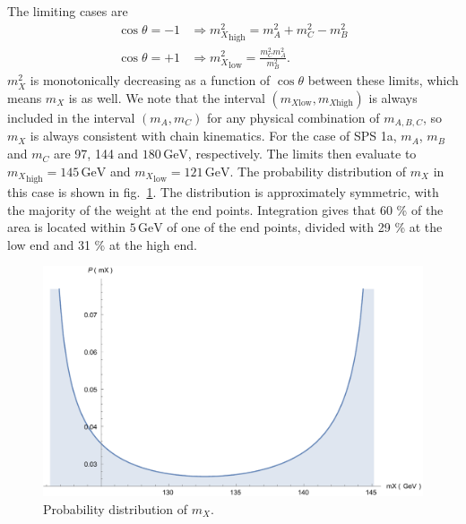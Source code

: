 \documentclass[twoside,english]{uiofysmaster}
\begin{document}
The limiting cases are
\begin{align}
	\cos\theta = -1 &\Rightarrow {m_X^2}_\mathrm{high} = m_A^2 + m_C^2 - m_B^2\\
	\cos\theta = +1 &\Rightarrow {m_X^2}_\mathrm{low} = \frac{m_C^2 m_A^2}{m_B^2}.\nonumber
\end{align}
$m_X^2$ is monotonically decreasing as a function of $\cos\theta$ between these limits, which means $m_X$ is as well. We note that the interval $(m_{X\mathrm{low}},m_{X\mathrm{high}})$ is always included in the interval $(m_A, m_C)$ for any physical combination of $m_{A,B,C}$, so $m_X$ is always consistent with chain kinematics. For the case of SPS 1a, $m_A$, $m_B$ and $m_C$ are 97, 144 and $180\,\mathrm{GeV}$, respectively. The limits then evaluate to ${m_X}_\mathrm{high} = 145 \,\mathrm{GeV}$ and ${m_X}_\mathrm{low} = 121 \, \mathrm{GeV}$. The probability distribution of $m_X$ in this case is shown in fig.\ \ref{fig:mX-dist}. 
The distribution is approximately symmetric, with the majority of the weight at the end points. Integration gives that 60 \% of the area is located within $5\,\mathrm{GeV}$ of one of the end points, divided with 29 \% at the low end and 31 \% at the high end.
\begin{figure}[hbt]
\centering
\includegraphics[scale=0.6]{figures/appendix/mX-distribution.pdf}
\caption{Probability distribution of $m_X$.}
\label{fig:mX-dist}
\end{figure}








\end{document}
